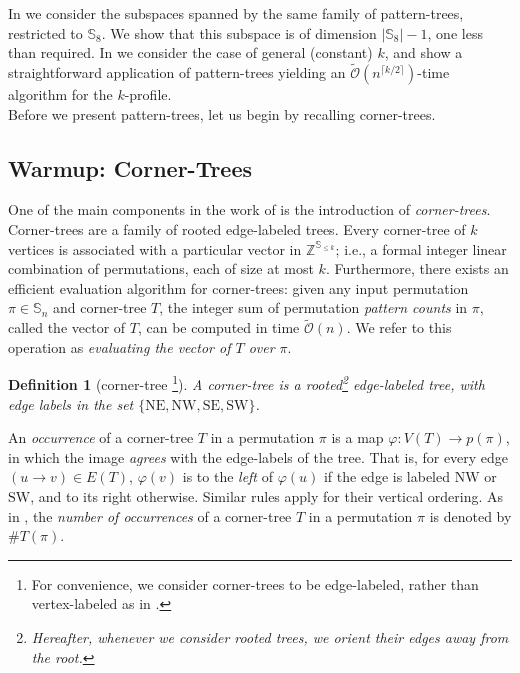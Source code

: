 \documentclass{article}
\newtheorem{definition}[theorem]{Definition}
\newcommand{\Sn}{\mathbb{S}_n}
\newcommand{\ZZ}{\mathbb{Z}}
\theoremstyle{remark}
\newcommand{\Otilde}[1]{\widetilde{\mathcal{O}}\left( #1 \right)}
\theoremstyle{plain}
\begin{document}
In  we consider the subspaces spanned by the same family of pattern-trees, restricted to $\mathbb{S}_8$.
We show that this subspace is of dimension $|\mathbb{S}_8| - 1$, one less than required.
In  we consider the case of general (constant) $k$, and show a straightforward 
application of pattern-trees yielding an $\widetilde{\mathcal{O}}(n^{\lceil k/2 \rceil})$-time algorithm
for the $k$-profile.\ \\


Before we present pattern-trees, let us begin by recalling corner-trees.

\subsection{Warmup: Corner-Trees}

One of the main components in the work of \cite{even2021counting} is the introduction of \emph{corner-trees}.
Corner-trees are a family of rooted edge-labeled trees. 
Every corner-tree of $k$ vertices is associated with a particular vector in $\ZZ^{\mathbb{S}_{\le k}}$;
i.e., a formal integer linear combination of permutations, each of size at most $k$.
Furthermore, there exists an efficient evaluation algorithm for corner-trees:
given any input permutation $\pi \in \Sn$ and corner-tree $T$,
the integer sum of permutation \textit{pattern counts} in $\pi$, called the vector of $T$,
can be computed in time $\Otilde{n}$. We refer to this operation
as \emph{evaluating the vector of $T$ over $\pi$}.

\begin{definition}[corner-tree \cite{even2021counting}\footnote{For convenience, we consider corner-trees to be edge-labeled, rather than vertex-labeled as in \cite{even2021counting}.}]
A corner-tree is a rooted\footnote{Hereafter, whenever we consider rooted trees, we orient their edges away from the root.} edge-labeled tree, with edge labels in the set $\{\mathrm{NE}, \mathrm{NW}, \mathrm{SE}, \mathrm{SW}\}$.
\end{definition}

An \textit{occurrence} of a corner-tree $T$ in a permutation $\pi$ is a map $\varphi: V(T) \to p(\pi)$, in which the image \textit{agrees} with the edge-labels of the tree. That is, for every edge $(u \to v) \in E(T)$, $\varphi(v)$ is to the \textit{left} of $\varphi(u)$ if the edge is labeled $\text{NW}$ or $\text{SW}$, and to its right otherwise. Similar rules apply for their vertical ordering.
As in \cite{even2021counting}, the \textit{number of occurrences} of a corner-tree $T$ in a permutation $\pi$ is denoted by $\#T(\pi)$.
\end{document}
